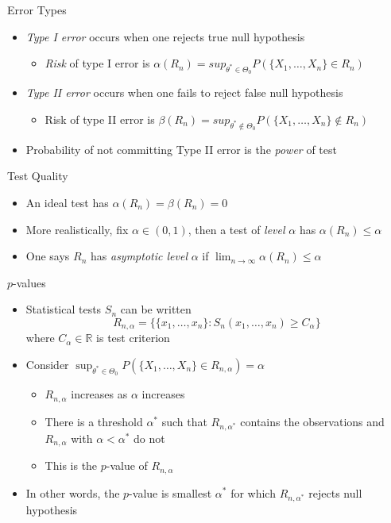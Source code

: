 \documentclass{beamer}
\begin{document}
\begin{frame}{Error Types}  
\begin{itemize} 
 \item \emph{Type I error} occurs when one rejects true null hypothesis 
 \begin{itemize}
 \item \emph{Risk} of type I error is $\alpha(R_n) = sup_{\theta^* \in \Theta_0} P(\{X_1, \ldots, X_n\} \in R_n)$
 \end{itemize} 
 \item\emph{Type II error} occurs when one fails to reject false null hypothesis
  \begin{itemize}
 \item Risk of type II error is $\beta(R_n) = sup_{\theta^* \notin \Theta_0} P(\{X_1, \ldots, X_n\} \notin R_n)$
 \end{itemize} 
 \item Probability of not committing Type II error is the \emph{power} of test
 
\end{itemize}
\end{frame}

\begin{frame}{Test Quality}
\begin{itemize} 
 \item An ideal test has $\alpha(R_n) = \beta(R_n) = 0$
 \item More realistically, fix $\alpha \in (0, 1)$, then a test of \emph{level} $\alpha$ has $\alpha(R_n) \leq \alpha$ 
 \item One says $R_n$ has \emph{asymptotic level} $\alpha$ if $\lim_{n \rightarrow \infty} \alpha(R_n) \leq \alpha$
\end{itemize} 
\end{frame}

\begin{frame}{$p$-values} 
\begin{itemize} 
 \item Statistical tests $S_n$ can be written 
 \begin{displaymath} 
  R_{n, \alpha} = \{\{x_1, \ldots, x_n\}: S_n(x_1, \ldots, x_n) \geq C_\alpha\}
 \end{displaymath}
  where $C_\alpha \in \mathbb{R}$ is test criterion 
 \item Consider $\sup_{\theta^* \in \Theta_0} P(\{X_1, \ldots, X_n\} \in R_{n, \alpha}) = \alpha$
  \begin{itemize}
  \item $R_{n, \alpha}$ increases as $\alpha$ increases 
  \item There is a threshold $\alpha^*$ such that $R_{n, \alpha^*}$ contains the observations and $R_{n, \alpha}$ with $\alpha < \alpha^*$ do not 
  \item This is the $p$-value of $R_{n, \alpha}$ 
  \end{itemize} 
 \item In other words, the $p$-value is smallest $\alpha^*$ for which $R_{n, \alpha^*}$ rejects null hypothesis  
\end{itemize}
\end{frame}
\end{document}
